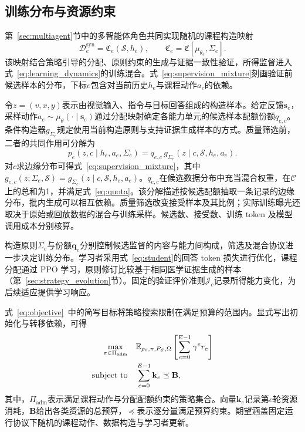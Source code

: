 \subsection{训练分布与资源约束}

第~\ref{sec:multiagent}节中的多智能体角色共同实现随机的课程构造映射
\begin{equation}
\mathcal D_e^{\mathrm{syn}}=\mathfrak C_e(\mathcal S,h_e),
\qquad
\mathfrak C_e=\mathfrak C[\mu_{\theta_e},\Sigma_e].
\label{eq:construction}
\end{equation}
该映射结合策略引导的分配、原则约束的生成与证据一致性验证，所得监督进入式~\ref{eq:learning_dynamics}的训练混合。式~\ref{eq:supervision_mixture}刻画验证前候选样本的分布，下标$e$包含对当前历史$h_e$与课程动作$a_e$的依赖。

令$z=(v,x,y)$表示由视觉输入、指令与目标回答组成的构造样本。给定反馈$\mathbf{s}_e$，采样动作$a_e\sim\mu_\theta(\cdot\mid \mathbf{s}_e)$通过分配映射确定各能力单元的候选样本配额份额$q_{e,c}$。条件构造器$g_{\Sigma_e}$规定使用当前构造原则与支持证据生成样本的方式。质量筛选前，二者的共同作用可分解为
\begin{equation}
p_e(z,c\mid h_e,a_e,\Sigma_e)
=q_{e,c}\,
g_{\Sigma_e}(z\mid c,\mathcal S,h_e,a_e).
\label{eq:factorization}
\end{equation}
对$c$求边缘分布可得式~\ref{eq:supervision_mixture}，其中$g_{e,c}(z;\Sigma_e,\mathcal S)=g_{\Sigma_e}(z\mid c,\mathcal S,h_e,a_e)$。$q_{e,c}$在候选数据分布中充当混合权重，在$\mathcal C$上的总和为1，并满足式~\ref{eq:quota}。该分解描述按候选配额抽取一条记录的边缘分布，批内生成可以相互依赖。质量筛选改变接受样本及其比例；实际训练曝光还取决于原始或回放数据的混合与训练采样。候选数、接受数、训练 token 及模型调用成本分别核算。

构造原则$\Sigma_e$与份额$\boldsymbol q_e$分别控制候选监督的内容与能力间构成，筛选及混合协议进一步决定训练分布。学习者采用式~\ref{eq:student}的回答 token 损失进行优化，课程分配通过 PPO 学习，原则修订比较基于相同医学证据生成的样本（第~\ref{sec:strategy_evolution}节）。固定的验证评价准则$\mathcal J_c$记录所得能力变化，为后续适应提供学习响应。

式~\ref{eq:objective}~中的简写目标将策略搜索限制在满足预算的范围内。显式写出初始化与转移依赖，可得
\begin{equation}
\begin{aligned}
\max_{\pi\in\Pi_{\mathrm{adm}}}\quad&
\mathbb E_{\rho_0,\pi,P_{\mathscr E},\Omega}
\left[\sum_{e=0}^{E-1}\gamma^e r_e\right]\\
\text{subject to}\quad&
\sum_{e=0}^{E-1}\mathbf k_e\preceq\mathbf B ,
\end{aligned}
\label{eq:objective_full}
\end{equation}
其中，$\Pi_{\mathrm{adm}}$表示满足课程动作与分配配额约束的策略集合。向量$\mathbf k_e$记录第$e$轮资源消耗，$\mathbf B$给出各类资源的总预算，$\preceq$表示逐分量满足预算约束。期望涵盖固定运行协议下随机的课程动作、数据构造与学习者更新。

